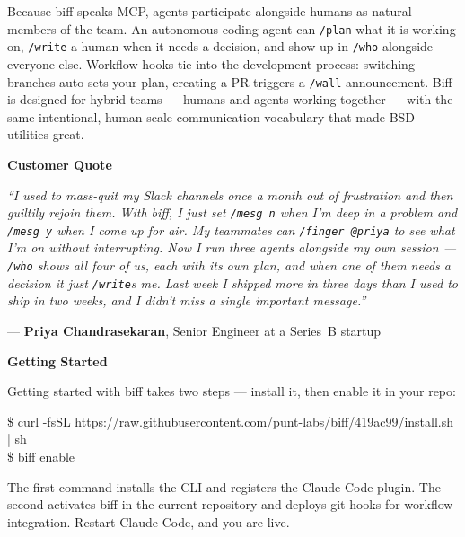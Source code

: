 \documentclass[11pt,letterpaper]{article}
\newcommand{\prsection}[1]{%
  \vspace{1em}%
  {\large\bfseries\color{SectionBlue}#1}%
  \vspace{0.3em}\par%
}
\begin{document}
Because biff speaks MCP, agents participate alongside humans as natural
members of the team. An autonomous coding agent can \texttt{/plan} what it
is working on, \texttt{/write} a human when it needs a decision, and show
up in \texttt{/who} alongside everyone else. Workflow hooks tie into the
development process: switching branches auto-sets your plan, creating a PR
triggers a \texttt{/wall} announcement. Biff is designed for hybrid teams
--- humans and agents working together --- with the same intentional,
human-scale communication vocabulary that made BSD utilities great.

\prsection{Customer Quote}

\begin{customerquote}
\textit{``I used to mass-quit my Slack channels once a month out of
frustration and then guiltily rejoin them. With biff, I just set
\texttt{/mesg n} when I'm deep in a problem and \texttt{/mesg y} when I
come up for air. My teammates can \texttt{/finger @priya} to see what I'm
on without interrupting. Now I run three agents alongside my own session
--- \texttt{/who} shows all four of us, each with its own plan, and when
one of them needs a decision it just \texttt{/write}s me. Last week I
shipped more in three days than I used to ship in two weeks, and I didn't
miss a single important message.''}

\raggedleft --- \textbf{Priya Chandrasekaran}, Senior Engineer at a
Series~B startup
\end{customerquote}

\prsection{Getting Started}

Getting started with biff takes two steps --- install it, then enable it
in your repo:

\begin{mdframed}[
  topline=false, bottomline=false, rightline=false, leftline=false,
  backgroundcolor=BoxBg,
  innerleftmargin=12pt, innerrightmargin=12pt,
  innertopmargin=8pt, innerbottommargin=8pt,
  skipabove=\baselineskip, skipbelow=\baselineskip,
]
\ttfamily\footnotesize
\textcolor{AccentGray}{\$} curl -fsSL https://raw.githubusercontent.com/punt-labs/biff/419ac99/install.sh | sh \\[0.6em]
\textcolor{AccentGray}{\$} biff enable
\end{mdframed}

\noindent The first command installs the CLI and registers the Claude Code
plugin. The second activates biff in the current repository and deploys
git hooks for workflow integration. Restart Claude Code, and you are live.
\end{document}
